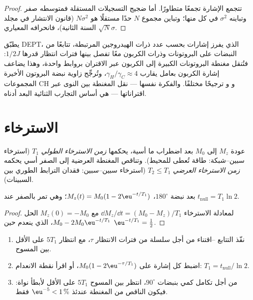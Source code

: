 \begin{proof}
تتجمع الإشارة تجمعًا متطاورًا. أما ضجيج التسجيلات المستقلة فمتوسطه
صفر وتباينه $\sigma^2$ في كل منها؛ وتباين مجموع $N$ حدًا مستقلًا هو
$N\sigma^2$ (قانون الانتشار في مجلد السنة الثانية)، فانحرافه المعياري
$\sqrt N\sigma$.
\end{proof}

يطبّق DEPT، الذي يفرز إشارات  بحسب عدد ذرات الهيدروجين المرتبطة،
تتابعًا من النبضات على البروتونات وذرات الكربون معًا تفصل بينها
فترات انتظار قدرها $1/2J$: فتُنقل مغنطة البروتونات الكبيرة إلى الكربون
عبر الاقتران بروابط واحدة، وهذا يضاعف إشارة الكربون بعامل يقارب
$\gamma_H/\gamma_C \approx 4$، وتُرجِّح زاوية نبضة البروتون الأخيرة المجموعات CH و 
و ترجيحًا مختلفًا. والفكرة نفسها --- نقل المغنطة بين النوى
عبر اقتراناتها --- هي أساس التجارب الثنائية البعد أدناه.

\section{الاسترخاء}

\begin{definition}\label{def:b3:advanced-nmr:relaxation}
عودة $M_z$ إلى $M_0$ بعد اضطراب ما أسية، يحكمها
\emph{زمن الاسترخاء الطولي} $T_1$
(استرخاء سبين--شبكة: طاقة تُعطى للمحيط). وتناقص
المغنطة العرضية إلى الصفر أسي يحكمه
\emph{زمن الاسترخاء العرضي} $T_2 \le T_1$
(استرخاء سبين--سبين: فقدان الترابط الطوري بين السبينات).
\end{definition}

\begin{proposition}\label{prop:b3:advanced-nmr:inversion-recovery}
بعد نبضة $180^\circ$، $M_z(t) = M_0(1 - 2\eu^{-t/T_1})$؛ وهي تمر بالصفر عند
$t_{\mathrm{null}} = T_1\ln2$.
\end{proposition}

\begin{proof}
لمعادلة الاسترخاء $\dd M_z/\dd t = (M_0 - M_z)/T_1$ مع $M_z(0) = -M_0$
الحل $M_0 - 2M_0\eu^{-t/T_1}$، الذي ينعدم حين $\eu^{-t/T_1} = \frac12$.
\end{proof}

\begin{method}\label{met:b3:advanced-nmr:t1}
\begin{enumerate}
  \item نفّذ التتابع --اقتناء من أجل سلسلة من فترات الانتظار
        $\tau$، مع انتظار $5T_1$ على الأقل بين المسوح.
  \item اضبط كل إشارة على $M_0(1 - 2\eu^{-\tau/T_1})$، أو اقرأ نقطة الانعدام: $T_1 =
        t_{\mathrm{null}}/\ln2$.
  \item من أجل تكامل كمي بنبضات $90^\circ$، انتظر بين المسوح $5T_1$ على الأقل لأبطأ
        نواة: فيكون الناقص من المغنطة عندئذ $\eu^{-5} < 1\,\%$
        فقط.
\end{enumerate}
\end{method}

